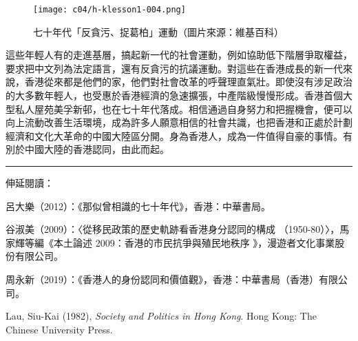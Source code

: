 \begin{figure}[htbp]
    \centering
    \texttt{[image: c04/h-klesson1-004.png]}
    \caption{七十年代「反貪污、捉葛柏」運動（圖片來源：維基百科）} 
\end{figure}

這些年輕人有的走進基層，搞起新一代的社會運動，例如協助低下階層爭取權益，要求把中文列為法定語言，還有反貪污的抗議運動。對這些在香港成長的新一代來說，香港從來都是他們的家，他們對社會改革的呼聲理直氣壯。即使沒有涉足政治的大多數年輕人，也受惠於香港經濟的急速擴張，中產階級慢慢形成。香港首個大型私人屋苑美孚新邨，也在七十年代落成。相信通過自身努力和把握機會，便可以向上流動改善生活環境，成為許多人願意相信的社會共識，也把香港和正處於計劃經濟和文化大革命的中國大陸區分開。身為香港人，成為一件值得自豪的事情。有別於中國大陸的香港認同，由此而起。

\rule[-10pt]{15cm}{0.05em}

伸延閱讀：

呂大樂（2012）：《那似曾相識的七十年代》，香港：中華書局。

谷淑美（2009）：〈從移民政策的歷史軌跡看香港身分認同的構成 （1950-80）〉，馬家輝等編《本土論述 2009：香港的市民抗爭與殖民地秩序 》，漫遊者文化事業股份有限公司。

周永新（2019）：《香港人的身份認同和價值觀》，香港：中華書局（香港）有限公司。

Lau, Siu-Kai (1982), \textit{Society and Politics in Hong Kong}. Hong Kong: The Chinese University Press.